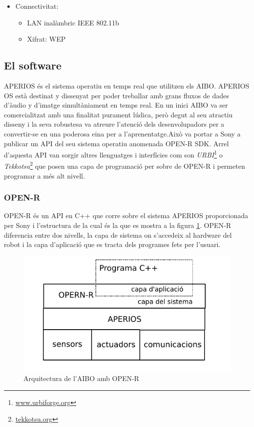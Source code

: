 \documentclass[12pt,a4paper,final,twoside]{article}
\begin{document}
\begin{itemize}
\item Connectivitat:
\begin{itemize}
\item LAN inalàmbric IEEE 802.11b
\item Xifrat: WEP
\end{itemize}
\end{itemize}

\subsection{El software}
APERIOS és el sistema operatiu en temps real que utilitzen els AIBO. APERIOS OS està destinat y dissenyat per poder treballar amb grans fluxos de dades d'àudio y d'imatge simultàniament en temps real.
En un inici AIBO va ser comercialitzat amb una finalitat purament lúdica, però degut al seu atractiu disseny i la seva robustesa va atreure l'atenció dels desenvolupadors per a convertir-se en una poderosa eina per a l'aprenentatge.Això va portar a Sony a publicar un API del seu sistema operatiu anomenada OPEN-R SDK. Arrel d'aquesta API van sorgir altres llenguatges i interfícies com son \textit{URBI}\footnote{\url{www.urbiforge.org}} o \textit{Tekkotsu}\footnote{\url{tekkotsu.org}} que posen una capa de programació per sobre de OPEN-R i permeten programar a més alt nivell.

\subsubsection{OPEN-R}
OPEN-R és un API en C++ que corre sobre el sistema APERIOS proporcionada per Sony i l'estructura de la cual és la que es mostra a la figura \ref{fig:openrarch}. OPEN-R diferencia entre dos nivells, la capa de sistema on s'accedeix al hardware del robot i la capa d'aplicació que es tracta dels programes fets per l'usuari.

\begin{figure}[h!]
	\centering
    \includegraphics[scale=1]{images/openrarch.pdf}
	 \caption{Arquitectura de l'AIBO amb OPEN-R}
  \label{fig:openrarch}
\end{figure}
\end{document}
